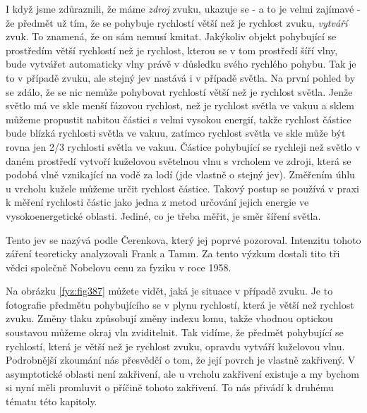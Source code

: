 {  I když jsme zdůraznili, že máme \emph{zdroj} zvuku, ukazuje se - a to je velmi zajímavé - že 
  předmět už tím, že se pohybuje rychlostí větší než je rychlost zvuku, \emph{vytváří} zvuk. To 
  znamená, že on sám nemusí kmitat. Jakýkoliv objekt pohybující se prostředím větší rychlostí než 
  je rychlost, kterou se v tom prostředí šíří vlny, bude vytvářet automaticky vlny právě v důsledku 
  svého rychlého pohybu. Tak je to v případě zvuku, ale stejný jev nastává i v případě světla. Na 
  první pohled by se zdálo, že se nic nemůže pohybovat rychlostí větší než je rychlost světla. 
  Jenže světlo má ve skle menší fázovou rychlost, než je rychlost světla ve vakuu a sklem můžeme 
  propustit nabitou částici s velmi vysokou energií, takže rychlost částice bude blízká rychlosti 
  světla ve vakuu, zatímco rychlost světla ve skle může být rovna jen 2/3 rychlosti světla ve 
  vakuu. Částice pohybující se rychleji než světlo v daném prostředí vytvoří kuželovou světelnou 
  vlnu s vrcholem ve zdroji, která se podobá vlně vznikající na vodě za lodí (jde vlastně o stejný 
  jev). Změřením úhlu u vrcholu kužele můžeme určit rychlost částice. Takový postup se používá v 
  praxi k měření rychlosti částic jako jedna z metod určování jejich energie ve vysokoenergetické 
  oblasti. Jediné, co je třeba měřit, je směr šíření světla. 
  
  Tento jev se nazývá podle Čerenkova, který jej poprvé pozoroval. Intenzitu tohoto záření 
  teoreticky analyzovali Frank a Tamm. Za tento výzkum dostali tito tři vědci společně Nobelovu 
  cenu za fyziku v roce 1958.
  
  Na obrázku \ref{fyz:fig387} můžete vidět, jaká je situace v případě zvuku. Je to fotografie 
  předmětu pohybujícího se v plynu rychlostí, která je větší než rychlost zvuku. Změny tlaku 
  způsobují změny indexu lomu, takže vhodnou optickou soustavou můžeme okraj vln zviditelnit. Tak 
  vidíme, že předmět pohybující se rychlostí, která je větší než je rychlost zvuku, opravdu vytváří 
  kuželovou vlnu. Podrobnější zkoumání nás přesvědčí o tom, že její povrch je vlastně zakřivený. V 
  asymptotické oblasti není zakřivení, ale u vrcholu zakřivení existuje a my bychom si nyní měli 
  promluvit o příčině tohoto zakřivení. To nás přivádí k druhému tématu této kapitoly.
  
}
